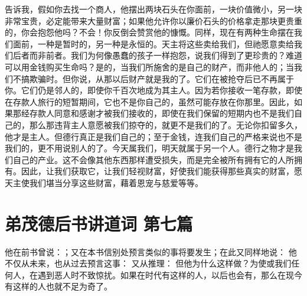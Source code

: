 告诉我，假如你去找一个商人，他摆出两块石头在你面前，一块价值微小，另一块非常宝贵，必定能带来大量财富；如果他允许你以廉价石头的价格拿走那块更贵重的，你会抱怨他吗？不会！你反倒会赞赏他的慷慨。同样，现在有两种生命摆在我们面前，一种是暂时的，另一种是永恒的。天主将这些卖给我们，但祂愿意卖给我们后者而非前者。我们为何像愚蠢的孩子一样抱怨，说我们得到了更珍贵的？难道可以用金钱购买生命吗？是的，当我们所施舍的是自己的财产，而非他人的；当我们不搞欺骗时。但你说，从那以后财产就是我的了。它们在被抢夺后已不再属于你。它们仍是邻人的，即使你千百次地成为其主人。因为若你接收一笔存款，即使在存款人旅行的短暂期间，它也不是你自己的，虽然可能存放在你那里。因此，如果那经存款人同意和感谢才被我们接收的，即使在我们保留的短期内也不是我们自己的，那么那违背主人意愿被我们掠夺的，就更不是我们的了。无论你扣留多久，他才是主人。但德行真正是我们自己的；至于金钱，连我们自己的严格来说也不是我们的，更不用说别人的了。今天属我们，明天就属于另一个人。德行之物才是我们自己的产业。这不会像其他东西那样遭受损失，而是完全被所有拥有它的人所拥有。因此，让我们获取它，让我们轻视财富，好使我们能获得那些真实的财富，愿天主使我们堪当分享这些财富，藉着恩宠与慈爱等等。\par



\section{弟茂德后书讲道词 第七篇}

\par

\par

他在前书曾说：；又在本书信别处预言类似的事将要发生；在此又同样地说： 他不仅从未来，也从过去预言这事： 又从推理： 但他为什么这样做？为使或我们任何人，在遇到恶人时不致惊扰。如果在时代有这样的人，以后也会有，那么在现今有这样的人也就不足为奇了。\par


